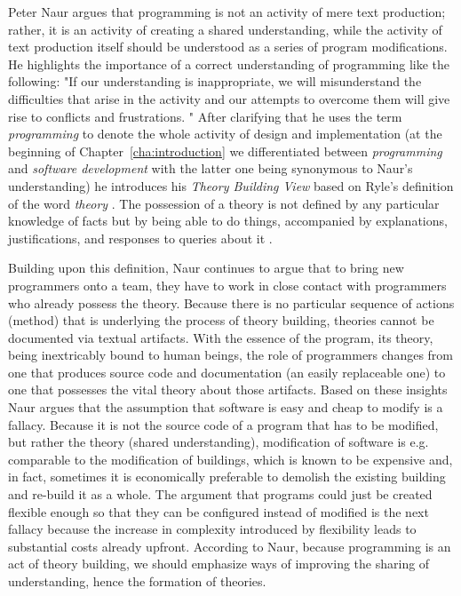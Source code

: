 Peter Naur argues that programming is not an activity of mere text production; rather, it is an activity of creating a shared understanding, while the activity of text production itself should be understood as a series of program modifications.
He highlights the importance of a correct understanding of programming like the following: "If our understanding is inappropriate, we will misunderstand the difficulties that arise in the activity and our attempts to overcome them will give rise to conflicts and frustrations. \cite{naur_programming_1985}"
After clarifying that he uses the term \emph{programming} to denote the whole activity of design and implementation (at the beginning of Chapter~\ref{cha:introduction} we differentiated between \emph{programming} and \emph{software development} with the latter one being synonymous to Naur's understanding) he introduces his \emph{Theory Building View} based on Ryle's definition of the word \emph{theory} \cite{ryle_concept_1984}.
The possession of a theory is not defined by any particular knowledge of facts but by being able to do things, accompanied by explanations, justifications, and responses to queries about it \cite{mouratidis_revisiting_2011}.

Building upon this definition, Naur continues to argue that to bring new programmers onto a team, they have to work in close contact with programmers who already possess the theory.
Because there is no particular sequence of actions (method) that is underlying the process of theory building, theories cannot be documented via textual artifacts.
With the essence of the program, its theory, being inextricably bound to human beings, the role of programmers changes from one that produces source code and documentation (an easily replaceable one) to one that possesses the vital theory about those artifacts.
Based on these insights Naur argues that the assumption that software is easy and cheap to modify is a fallacy.
Because it is not the source code of a program that has to be modified, but rather the theory (shared understanding), modification of software is e.g. comparable to the modification of buildings, which is known to be expensive and, in fact, sometimes it is economically preferable to demolish the existing building and re-build it as a whole.
The argument that programs could just be created flexible enough so that they can be configured instead of modified is the next fallacy because the increase in complexity introduced by flexibility leads to substantial costs already upfront.
According to Naur, because programming is an act of theory building, we should emphasize ways of improving the sharing of understanding, hence the formation of theories.

